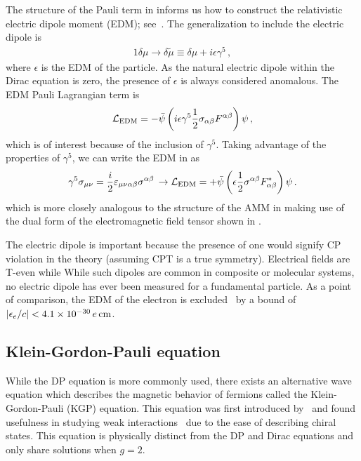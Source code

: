 The structure of the Pauli term in  informs us how to construct the relativistic electric dipole moment (EDM); see~\cite{Knecht:2003kc,Jegerlehner:2017gek}. The generalization to include the electric dipole is
\begin{alignat}{1}
	\label{edm:1} \delta\mu\rightarrow\delta\tilde{\mu}\equiv\delta\mu+i\epsilon\gamma^{5}\,,
\end{alignat}
where $\epsilon$ is the EDM of the particle. As the natural electric dipole within the Dirac equation is zero, the presence of $\epsilon$ is always considered anomalous. The EDM Pauli Lagrangian term is
\begin{gather}
    \label{ledm:1}
    {\cal L}_{\rm EDM} = -{\bar\psi}\left(i\epsilon\gamma^{5}\frac{1}{2}\sigma_{\alpha\beta}F^{\alpha\beta}\right)\psi\,,
\end{gather}
which is of interest because of the inclusion of $\gamma^{5}$. Taking advantage of the properties of $\gamma^{5}$, we can write the EDM in  as
\begin{gather}
    \label{ledm:3}
    \gamma^{5}\sigma_{\mu\nu}=\frac{i}{2}\varepsilon_{\mu\nu\alpha\beta}\sigma^{\alpha\beta}\,\rightarrow
    {\cal L}_{\rm EDM} = +{\bar\psi}\left(\epsilon\frac{1}{2}\sigma^{\alpha\beta}F_{\alpha\beta}^{*}\right)\psi\,.
\end{gather}
which is more closely analogous to the structure of the AMM in  making use of the dual form of the electromagnetic field tensor shown in .

The electric dipole is important because the presence of one would signify CP violation in the theory (assuming CPT is a true symmetry). Electrical fields are T-even while While such dipoles are common in composite or molecular systems, no electric dipole has ever been measured for a fundamental particle. As a point of comparison, the EDM of the electron is excluded~\citep{ACME:2018yjb,Roussy:2022cmp} by a bound of $|\epsilon_{e}/c|<4.1\times10^{-30}\, e\,{\rm cm}$.

\subsection{Klein-Gordon-Pauli equation}
\label{sec:kgp}
\noindent While the DP equation is more commonly used, there exists an alternative wave equation which describes the magnetic behavior of fermions called the Klein-Gordon-Pauli (KGP) equation. This equation was first introduced by~\cite{Fock:1937dy} and found usefulness in studying weak interactions~\citep{Feynman:1958ty} due to the ease of describing chiral states. This equation is physically distinct from the DP and Dirac equations and only share solutions when $g=2$.

